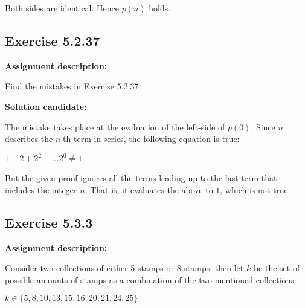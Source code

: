 \documentclass{report}
\newcommand{\cent}[1]{\begin{center}#1\end{center}}
\newcommand{\In}{\! \in \!}
\newcommand{\assignmentDescription}{\textbf{Assignment description: }}
\newcommand{\solution}{\textbf{Solution candidate: }}
\newcommand{\QED}{\boxed{}}
\newcommand{\Exercise}[1]{\subsection{Exercise #1}}
\begin{document}
 	Both sides are identical. Hence $p(n)$ holds.\\
 	
 	\QED
 	
 	\Exercise{5.2.37}
 	
 	\assignmentDescription
 	
 	Find the mistakes in Exercise 5.2.37.
 	
 	\solution
 	
 	The mistake takes place at the evaluation of the left-side of $p(0)$. Since $n$ describes the $n$'th term in series, the following equation is true:
 	
 	\cent{$ 1+ 2 + 2^2 + \dots 2^0 \neq 1 $}
 	
 	But the given proof ignores all the terms leading up to the last term that includes the integer $n$. That is, it evaluates the above to $1$, which is not true. \\
 	
 	\QED
 	
 	\Exercise{5.3.3}
 	\assignmentDescription
 	
 	Consider two collections of either 5 stamps or 8 stamps, then let $k$ be the set of possible amounts of stamps as a combination of the two mentioned collections:
 	
 	\cent{$k \In \{5,8,10,13,15,16,20,21,24,25\}$}
 	
\end{document}
